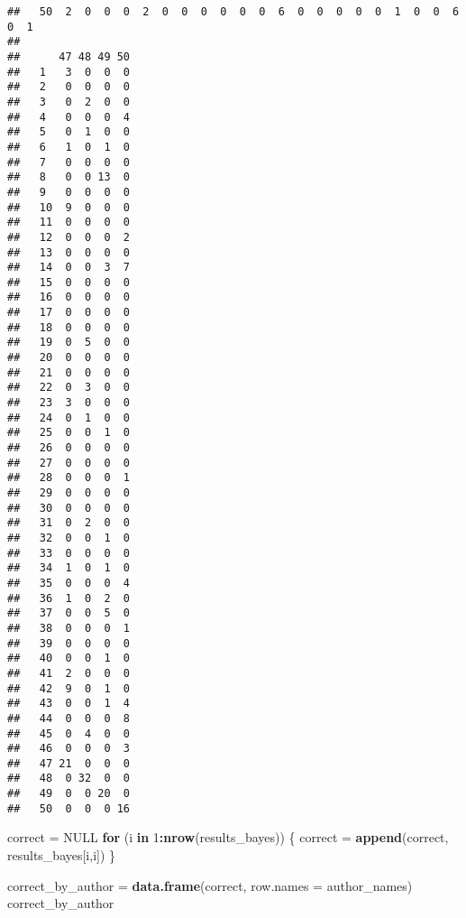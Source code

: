\documentclass[]{article}
\newenvironment{Shaded}{\begin{snugshade}}{\end{snugshade}}
\newcommand{\KeywordTok}[1]{\textcolor[rgb]{0.13,0.29,0.53}{\textbf{#1}}}
\newcommand{\DataTypeTok}[1]{\textcolor[rgb]{0.13,0.29,0.53}{#1}}
\newcommand{\DecValTok}[1]{\textcolor[rgb]{0.00,0.00,0.81}{#1}}
\newcommand{\StringTok}[1]{\textcolor[rgb]{0.31,0.60,0.02}{#1}}
\newcommand{\OtherTok}[1]{\textcolor[rgb]{0.56,0.35,0.01}{#1}}
\newcommand{\ControlFlowTok}[1]{\textcolor[rgb]{0.13,0.29,0.53}{\textbf{#1}}}
\newcommand{\OperatorTok}[1]{\textcolor[rgb]{0.81,0.36,0.00}{\textbf{#1}}}
\newcommand{\NormalTok}[1]{#1}
\begin{document}
\begin{verbatim}
##   50  2  0  0  0  2  0  0  0  0  0  0  6  0  0  0  0  0  1  0  0  6  0  1
##     
##      47 48 49 50
##   1   3  0  0  0
##   2   0  0  0  0
##   3   0  2  0  0
##   4   0  0  0  4
##   5   0  1  0  0
##   6   1  0  1  0
##   7   0  0  0  0
##   8   0  0 13  0
##   9   0  0  0  0
##   10  9  0  0  0
##   11  0  0  0  0
##   12  0  0  0  2
##   13  0  0  0  0
##   14  0  0  3  7
##   15  0  0  0  0
##   16  0  0  0  0
##   17  0  0  0  0
##   18  0  0  0  0
##   19  0  5  0  0
##   20  0  0  0  0
##   21  0  0  0  0
##   22  0  3  0  0
##   23  3  0  0  0
##   24  0  1  0  0
##   25  0  0  1  0
##   26  0  0  0  0
##   27  0  0  0  0
##   28  0  0  0  1
##   29  0  0  0  0
##   30  0  0  0  0
##   31  0  2  0  0
##   32  0  0  1  0
##   33  0  0  0  0
##   34  1  0  1  0
##   35  0  0  0  4
##   36  1  0  2  0
##   37  0  0  5  0
##   38  0  0  0  1
##   39  0  0  0  0
##   40  0  0  1  0
##   41  2  0  0  0
##   42  9  0  1  0
##   43  0  0  1  4
##   44  0  0  0  8
##   45  0  4  0  0
##   46  0  0  0  3
##   47 21  0  0  0
##   48  0 32  0  0
##   49  0  0 20  0
##   50  0  0  0 16
\end{verbatim}

\begin{Shaded}
\begin{Highlighting}[]
\NormalTok{correct =}\StringTok{ }\OtherTok{NULL}
\ControlFlowTok{for}\NormalTok{ (i }\ControlFlowTok{in} \DecValTok{1}\OperatorTok{:}\KeywordTok{nrow}\NormalTok{(results_bayes)) \{}
\NormalTok{  correct =}\StringTok{ }\KeywordTok{append}\NormalTok{(correct, results_bayes[i,i])}
\NormalTok{\}}

\NormalTok{correct_by_author =}\StringTok{ }\KeywordTok{data.frame}\NormalTok{(correct, }\DataTypeTok{row.names =}\NormalTok{ author_names)}
\NormalTok{correct_by_author}
\end{Highlighting}
\end{Shaded}
\end{document}
